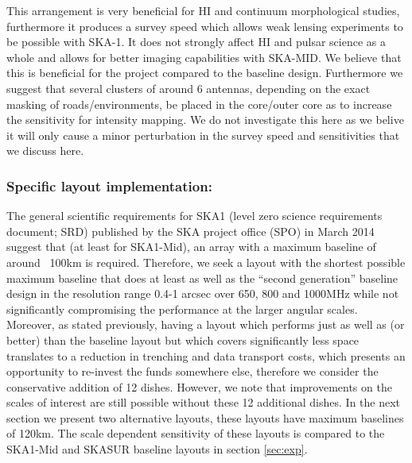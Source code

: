 \documentclass[sfheadings,a4paper,times,9pt,floats,floatfix]{article}
\begin{document}
This arrangement is very beneficial for HI and continuum morphological studies,
furthermore it produces a survey speed which allows weak lensing experiments to be
possible with SKA-1. It does not strongly affect HI and pulsar science as a whole and allows for
better imaging capabilities with SKA-MID. We believe that this is beneficial for the project
compared to the baseline design. Furthermore we suggest that several clusters of around 6
antennas, depending on the exact masking of roads/environments, be placed in the core/outer
core as to increase the sensitivity for intensity mapping. We do not
investigate this here as we belive it will only cause a minor perturbation in
the survey speed and sensitivities that we discuss here.

\subsubsection{Specific layout implementation:}
The general scientific requirements for SKA1\cite{srd} (level zero science requirements document; SRD) published by the
SKA project office (SPO) in March 2014 suggest that (at least for
SKA1-Mid), an array with a maximum baseline of around ~100km is required. Therefore, we seek a layout with the shortest possible
maximum baseline that does at least as well as the ``second generation'' baseline design in the resolution range 0.4-1 arcsec over
650, 800 and 1000MHz while not significantly compromising the performance at the larger angular scales. Moreover, as stated
previously, having a layout which performs just as well as (or better) than the baseline layout but which covers significantly
less space translates to a reduction in trenching and data transport costs, which presents an opportunity to re-invest the funds
somewhere else, therefore we consider the conservative addition of 12 dishes. However, we note that improvements on the scales of
interest are still possible without these 12 additional dishes. In the next section we present two alternative
layouts, these layouts have maximum baselines of 120km. The scale dependent sensitivity of these layouts is
compared to the SKA1-Mid and SKASUR baseline layouts in section \ref{sec:exp}.
\end{document}
